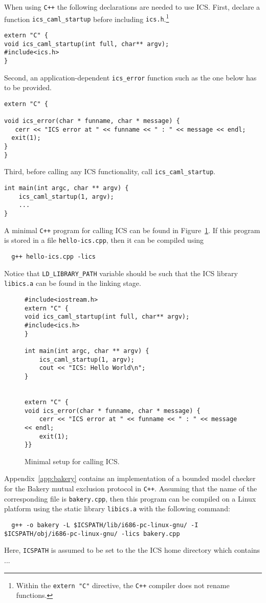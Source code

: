 \documentclass[12pt]{article}
\begin{document}
When using {\tt C++} the following declarations are needed to
use ICS.  First, declare a function {\tt ics\_caml\_startup} before
including {\tt ics.h}.\footnote{Within the {\tt extern "C"} directive,
the {\tt C++} compiler does not rename functions.}
\begin{verbatim}
extern "C" {
void ics_caml_startup(int full, char** argv);
#include<ics.h>
}
\end{verbatim}
Second, an application-dependent {\tt ics\_error} function
such as the one below has to be provided.
\begin{verbatim}
extern "C" {

void ics_error(char * funname, char * message) {
   cerr << "ICS error at " << funname << " : " << message << endl;
  exit(1);
}
}
\end{verbatim}
Third, before calling any ICS functionality, call {\tt ics\_caml\_startup}.
\begin{verbatim}
int main(int argc, char ** argv) {
    ics_caml_startup(1, argv);
    ...
}
\end{verbatim}
A minimal {\tt C++} program for calling ICS can be found in 
Figure~\ref{fig:hello-ics}. If this program is stored in a file
{\tt hello-ics.cpp}, then it can be compiled using
  \begin{verbatim} 
  g++ hello-ics.cpp -lics
  \end{verbatim}
Notice that {\tt LD\_LIBRARY\_PATH} variable should be such that
the ICS library {\tt libics.a} can be found in the linking stage.

\begin{figure}[t]
\begin{verbatim}
#include<iostream.h>
extern "C" {
void ics_caml_startup(int full, char** argv);
#include<ics.h>
}

int main(int argc, char ** argv) {
    ics_caml_startup(1, argv);
    cout << "ICS: Hello World\n";
}


extern "C" {
void ics_error(char * funname, char * message) {
    cerr << "ICS error at " << funname << " : " << message << endl;
    exit(1);
}}
\end{verbatim}
\caption{Minimal setup for calling ICS.\label{fig:hello-ics}}
\end{figure}

Appendix~\ref{app:bakery} contains an implementation of a bounded
model checker for the Bakery mutual exclusion protocol in {\tt C++}.
Assuming that the name of the corresponding file is {\tt bakery.cpp},
then this program can be compiled on a Linux platform using the 
static library {\tt libics.a} with the following command:
  \begin{verbatim}
  g++ -o bakery -L $ICSPATH/lib/i686-pc-linux-gnu/ -I $ICSPATH/obj/i686-pc-linux-gnu/ -lics bakery.cpp
  \end{verbatim}
Here, {\tt ICSPATH} is assumed to be set to the the ICS home directory
which contains ...
\end{document}
